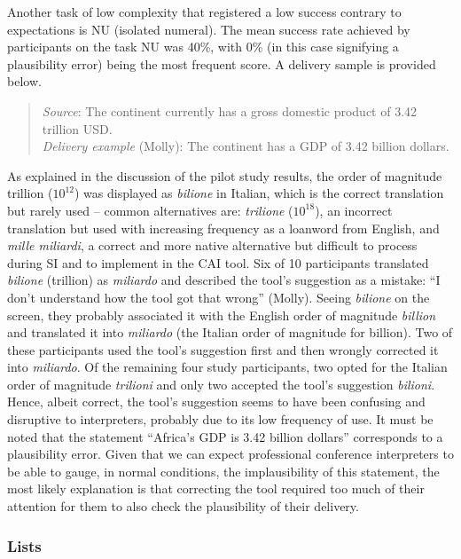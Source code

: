 Another task of low complexity that registered a low success contrary to expectations is NU (isolated numeral). The mean success rate achieved by participants on the task NU was 40\%, with 0\% (in this case signifying a plausibility error) being the most frequent score. A delivery sample is provided below.
\begin{quote}
    \textit{Source}: The continent currently has a gross domestic product of 3.42 trillion USD.\\
\textit{Delivery example} (Molly): The continent has a GDP of 3.42 billion dollars.
\end{quote}

As explained in the discussion of the pilot study results, the order of magnitude trillion ($10^{12}$) was displayed as \textit{bilione} in Italian, which is the correct translation but rarely used -- common alternatives are: \textit{trilione} ($10^{18}$), an incorrect translation but used with increasing frequency as a loanword from English, and \textit{mille miliardi}, a correct and more native alternative but difficult to process during SI and to implement in the CAI tool. Six of 10 participants translated \textit{bilione} (trillion) as \textit{miliardo} and described the tool’s suggestion as a mistake: ``I don’t understand how the tool got that wrong'' (Molly). Seeing \textit{bilione} on the screen, they probably associated it with the English order of magnitude \textit{billion} and translated it into \textit{miliardo} (the Italian order of magnitude for billion). Two of these participants used the tool’s suggestion first and then wrongly corrected it into \textit{miliardo}. Of the remaining four study participants, two opted for the Italian order of magnitude \textit{trilioni} and only two accepted the tool’s suggestion \textit{bilioni}. Hence, albeit correct, the tool’s suggestion seems to have been confusing and disruptive to interpreters, probably due to its low frequency of use. It must be noted that the statement ``Africa’s GDP is 3.42 billion dollars'' corresponds to a plausibility error. Given that we can expect professional conference interpreters to be able to gauge, in normal conditions, the implausibility of this statement, the most likely explanation is that correcting the tool required too much of their attention for them to also check the plausibility of their delivery.

\subsubsection{Lists}

